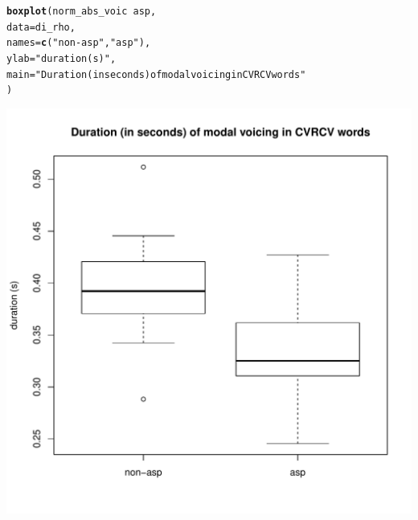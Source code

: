 \documentclass[a4paper,11pt]{article}\usepackage[]{graphicx}\usepackage[]{color}
\makeatletter
\def\maxwidth{ %
  \ifdim\Gin@nat@width>\linewidth
    \linewidth
  \else
    \Gin@nat@width
  \fi
}
\newcommand{\hlstr}[1]{\textcolor[rgb]{0.192,0.494,0.8}{#1}}%
\newcommand{\hlopt}[1]{\textcolor[rgb]{0,0,0}{#1}}%
\newcommand{\hlstd}[1]{\textcolor[rgb]{0.345,0.345,0.345}{#1}}%
\newcommand{\hlkwc}[1]{\textcolor[rgb]{0.333,0.667,0.333}{#1}}%
\newcommand{\hlkwd}[1]{\textcolor[rgb]{0.737,0.353,0.396}{\textbf{#1}}}%
\newenvironment{kframe}{%
 \def\at@end@of@kframe{}%
 \ifinner\ifhmode%
  \def\at@end@of@kframe{\end{minipage}}%
  \begin{minipage}{\columnwidth}%
 \fi\fi%
 \def\FrameCommand##1{\hskip\@totalleftmargin \hskip-\fboxsep
 \colorbox{shadecolor}{##1}\hskip-\fboxsep
     \hskip-\linewidth \hskip-\@totalleftmargin \hskip\columnwidth}%
 \MakeFramed {\advance\hsize-\width
   \@totalleftmargin\z@ \linewidth\hsize
   \@setminipage}}%
 {\par\unskip\endMakeFramed%
 \at@end@of@kframe}
\newenvironment{knitrout}{}{} %
\makeatother
\begin{document}
\begin{knitrout}
\end{knitrout}

\begin{knitrout}
\color{fgcolor}\begin{kframe}
\begin{alltt}
\hlkwd{boxplot}\hlstd{(norm_abs_voic} \hlopt{~} \hlstd{asp,}
        \hlkwc{data} \hlstd{= di_rho,}
        \hlkwc{names} \hlstd{=} \hlkwd{c}\hlstd{(}\hlstr{"non-asp"}\hlstd{,} \hlstr{"asp"}\hlstd{),}
        \hlkwc{ylab} \hlstd{=} \hlstr{"duration (s)"}\hlstd{,}
        \hlkwc{main} \hlstd{=} \hlstr{"Duration (in seconds) of modal voicing in CVRCV words"}
        \hlstd{)}
\end{alltt}
\end{kframe}
\includegraphics[width=\maxwidth]{img/bi-rho-box-1} 

\end{knitrout}
\end{document}
